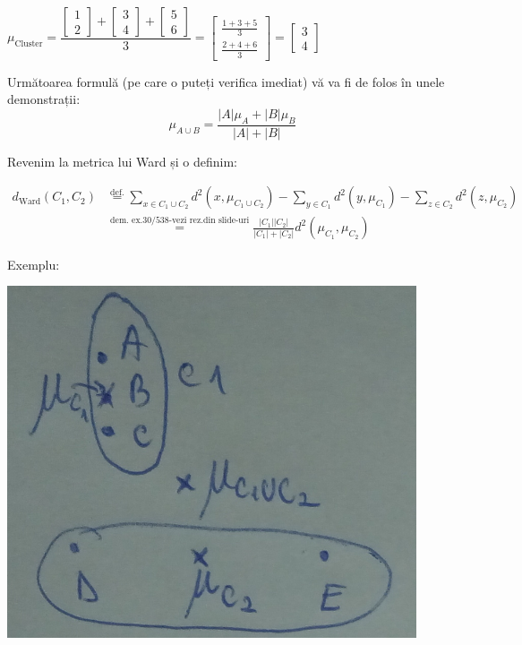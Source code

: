 \documentclass[12pt]{article}
\begin{document}
\begin{enumerate}
\begin{itemize}
			$\mu_\text{Cluster} = \dfrac{\begin{bmatrix}
				1\\
				2
				\end{bmatrix} + \begin{bmatrix}
				3\\
				4
				\end{bmatrix} + \begin{bmatrix}
				5\\
				6
				\end{bmatrix}}{3} = \begin{bmatrix}
			\frac{1+3+5}{3}\\
			\frac{2+4+6}{3}
		\end{bmatrix} = \begin{bmatrix}
		3\\
		4
		\end{bmatrix}$

		Următoarea formulă (pe care o puteți verifica imediat) vă va fi de folos în unele demonstrații: $$\mu_{A \cup B} = \frac{|A| \mu_A + |B| \mu_B}{|A| + |B|}$$
		
		Revenim la metrica lui Ward și o definim:
		
		\begin{align*}
		d_\text{Ward}(C_1,C_2) &\stackrel{\text{def.}}{=} \sum_{x \in C_1 \cup C_2} d^2(x, \mu_{C_1 \cup C_2}) - \sum_{y \in C_1} d^2(y,\mu_{C_1}) - \sum_{z \in C_2} d^2(z,\mu_{C_2})\\
		&\stackrel{\text{dem. ex.30/538-vezi rez.din slide-uri}}{=} \frac{|C_1| |C_2|}{|C_1| + |C_2|} d^2(\mu_{C_1},\mu_{C_2})
		\end{align*}
		
		Exemplu: \begin{center}
			\includegraphics{screenshot007}
		\end{center}
		

\end{itemize}
\end{enumerate}
\end{document}

